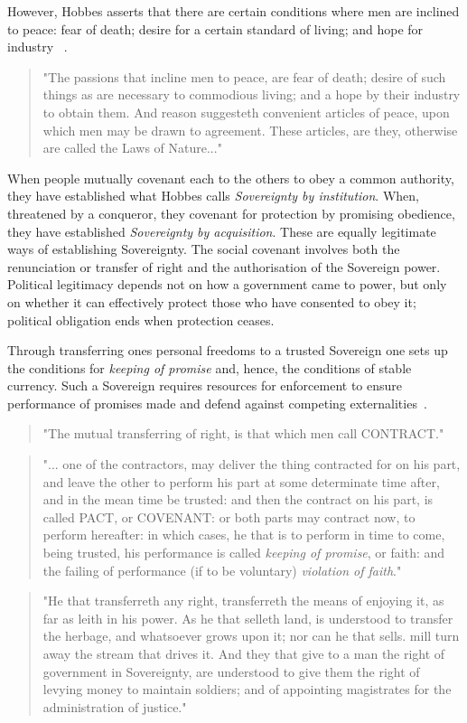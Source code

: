 \documentclass[11pt, oneside]{article}   	%
\begin{document}
However, Hobbes asserts that there are certain conditions where men are inclined to peace: fear of death; desire for a certain standard of living; and hope for industry ~\cite{th1}.

\begin{quote}
"The passions that incline men to peace, are fear of death; desire of such things as are necessary to commodious living; and a hope by their industry to obtain them. And reason suggesteth convenient articles of peace, upon which men may be drawn to agreement. These articles, are they, otherwise are called the Laws of Nature..."
\end{quote}

When people mutually covenant each to the others to obey a common authority, they have established what Hobbes calls \emph{Sovereignty by institution}. When, threatened by a conqueror, they covenant for protection by promising obedience, they have established \emph{Sovereignty by acquisition}. These are equally legitimate ways of establishing Sovereignty. The social covenant involves both the renunciation or transfer of right and the authorisation of the Sovereign power. Political legitimacy depends not on how a government came to power, but only on whether it can effectively protect those who have consented to obey it; political obligation ends when protection ceases.\par

Through transferring ones personal freedoms to a trusted Sovereign one sets up the conditions for \emph{keeping of promise} and, hence, the conditions of stable currency. Such a Sovereign requires resources for enforcement to ensure performance of promises made and defend against competing externalities~\cite{th1}.

\begin{quote}
"The mutual transferring of right, is that which men call CONTRACT."
\end{quote}
\begin{quote}
"... one of the contractors, may deliver the thing contracted for on his part, and leave the other to perform his part at some determinate time after, and in the mean time be trusted: and then the contract on his part, is called PACT, or COVENANT: or both parts may contract now, to perform hereafter: in which cases, he that is to perform in time to come, being trusted, his performance is called \emph{keeping of promise}, or faith: and the failing of performance (if to be voluntary) \emph{violation of faith}."
\end{quote}
\begin{quote}
"He that transferreth any right, transferreth the means of enjoying it, as far as leith in his power. As he that selleth land, is understood to transfer the herbage, and whatsoever grows upon it; nor can he that sells. mill turn away the stream that drives it. And they that give to a man the right of government in Sovereignty, are understood to give them the right of levying money to maintain soldiers; and of appointing magistrates for the administration of justice."
\end{quote}
\end{document}
